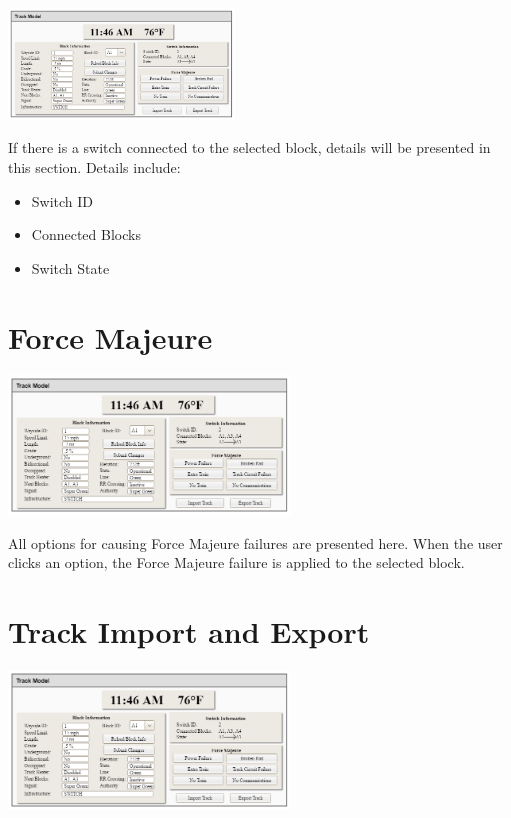 \documentclass{scrreprt}
\begin{document}
\begin{center}
    \includegraphics[trim={14.2cm 5.75cm .5cm 3.6cm},clip,width=6cm]{track-model}
\end{center}

If there is a switch connected to the selected block, details will be presented in
this section. Details include:
\begin{itemize}
    \item Switch ID
    \item Connected Blocks
    \item Switch State
\end{itemize}

\section{Force Majeure}

\begin{center}
    \includegraphics[trim={14.2cm 1.75cm .5cm 6.5cm},clip,width=7.5cm]{track-model}
\end{center}

All options for causing Force Majeure failures are presented here. When the user clicks
an option, the Force Majeure failure is applied to the selected block.

\section{Track Import and Export}

\begin{center}
    \includegraphics[trim={14.2cm .5cm .5cm 10.75cm},clip,width=7.5cm]{track-model}
\end{center}
\end{document}
